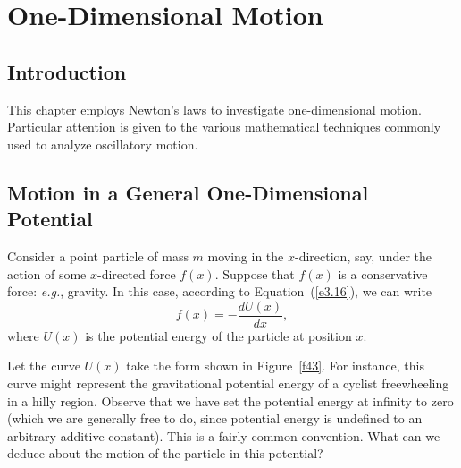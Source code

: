 \chapter{One-Dimensional Motion}
\section{Introduction}
This chapter employs Newton's laws  to 
investigate one-dimensional motion. Particular
attention is given to the various mathematical techniques commonly used
to analyze  oscillatory motion.

\section{Motion in a General One-Dimensional Potential}\label{gpotn}
Consider a point particle of mass $m$ moving in the $x$-direction, say,
under the action of some $x$-directed force $f(x)$. 
Suppose that $f(x)$ is a conservative force: {\em e.g.}, gravity. In this case,
according to Equation~(\ref{e3.16}), we can write
\begin{equation}\label{egrad}
f(x) = - \frac{dU(x)}{dx},
\end{equation}
where $U(x)$ is the potential energy of the particle at position $x$. 

Let the curve $U(x)$ take the form shown in Figure~\ref{f43}.
For instance, this curve might represent the gravitational potential energy 
of a cyclist freewheeling in a hilly region. Observe that we have set the
potential energy at infinity to zero (which we are generally
free to do, since
potential energy is undefined to an arbitrary additive constant). This is a  fairly common  convention.
What can we deduce about the motion of the particle in this potential?

